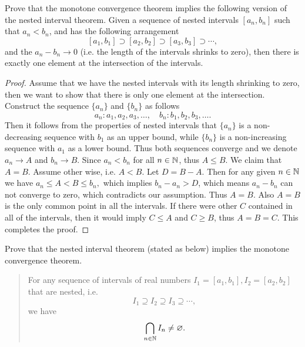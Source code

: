 \begin{problem}
	Prove that the monotone convergence theorem implies the following version of the nested interval theorem. Given a sequence of nested intervals $[a_n, b_n]$ such that $a_n < b_n$, and has the following arrangement 
	\[ [a_1, b_1] \supset [a_2, b_2] \supset [a_3, b_3] \supset \cdots, \]
	and the $a_n - b_n \to 0$ (i.e. the length of the intervals shrinks to zero), then there is exactly one element at the intersection of the intervals.
\end{problem}
\begin{proof}
		Assume that we have the nested intervals with its length shrinking to zero, then we want to show that there is only one element at the intersection.
		Construct the sequence $\{a_n\}$ and $\{b_n\}$ as follows
		\[a_n: a_1, a_2, a_3, \hdots, \quad b_n: b_1, b_2, b_3, \hdots. \]
		Then it follows from the properties of nested intervals that $\{a_n\}$ is a non-decreasing sequence with $b_1$ as an upper bound, while $\{b_n\}$ is a non-increasing sequence with $a_1$ as a lower bound. Thus both sequences converge and we denote $a_n \to A$ and $b_n \to B$. Since $a_n < b_n$ for all $n\in \mathbb{N}$, thus $A \leq B$. We claim that $A = B$. Assume other wise, i.e. $A<B$. Let $D = B - A$. Then for any given $n \in \mathbb{N}$ we have $a_n \leq A < B \leq b_n,$ which implies $b_n - a_n > D$, which means $a_n - b_n$ can not converge to zero, which contradicts our assumption. Thus $A=B$. Also $A=B$ is the only common point in all the intervals. If there were other $C$ contained in all of the intervals, then it would imply $C \leq A$ and $C \geq B$, thus $A = B = C$. This completes the proof.
\end{proof}

\begin{problem}
	Prove that the nested interval theorem (stated as below) implies the monotone convergence theorem. 
	\begin{quote}
		For any sequence of intervals of real numbers $I_1 = [a_1, b_1], I_2 = [a_2, b_2]$ that are nested, i.e.
		\[ I_1 \supseteq I_2 \supseteq I_3 \supseteq \cdots, \]
		we have 
		\[ \bigcap_{n\in\mathbb{N}} I_n \neq \varnothing. \]
	\end{quote}
\end{problem}

